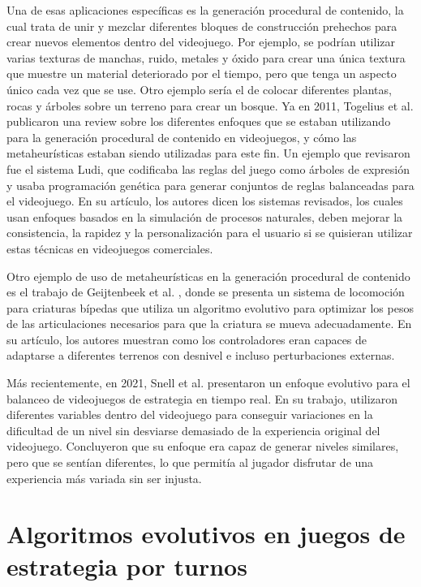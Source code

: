 Una de esas aplicaciones específicas es la generación procedural de contenido, la cual trata de unir y mezclar diferentes bloques de construcción prehechos para crear nuevos elementos dentro del videojuego. Por ejemplo, se podrían utilizar varias texturas de manchas, ruido, metales y óxido para crear una única textura que muestre un material deteriorado por el tiempo, pero que tenga un aspecto único cada vez que se use. Otro ejemplo sería el de colocar diferentes plantas, rocas y árboles sobre un terreno para crear un bosque. Ya en 2011, Togelius et al. \cite{togelius_search-based_2011} publicaron una review sobre los diferentes enfoques que se estaban utilizando para la generación procedural de contenido en videojuegos, y cómo las metaheurísticas estaban siendo utilizadas para este fin. Un ejemplo que revisaron fue el sistema Ludi, que codificaba las reglas del juego como árboles de expresión y usaba programación genética para generar conjuntos de reglas balanceadas para el videojuego. En su artículo, los autores dicen los sistemas revisados, los cuales usan enfoques basados en la simulación de procesos naturales, deben mejorar la consistencia, la rapidez y la personalización para el usuario si se quisieran utilizar estas técnicas en videojuegos comerciales. 

Otro ejemplo de uso de metaheurísticas en la generación procedural de contenido es el trabajo de Geijtenbeek et al. \cite{geijtenbeek_flexible_2013}, donde se presenta un sistema de locomoción para criaturas bípedas que utiliza un algoritmo evolutivo para optimizar los pesos de las articulaciones necesarios para que la criatura se mueva adecuadamente. En su artículo, los autores muestran como los controladores eran capaces de adaptarse a diferentes terrenos con desnivel e incluso perturbaciones externas.

Más recientemente, en 2021, Snell et al. \cite{snell_evolutionary_2021} presentaron un enfoque evolutivo para el balanceo de videojuegos de estrategia en tiempo real. En su trabajo, utilizaron diferentes variables dentro del videojuego para conseguir variaciones en la dificultad de un nivel sin desviarse demasiado de la experiencia original del videojuego. Concluyeron que su enfoque era capaz de generar niveles similares, pero que se sentían diferentes, lo que permitía al jugador disfrutar de una experiencia más variada sin ser injusta.

\section{Algoritmos evolutivos en juegos de estrategia por turnos} \label{sec:trabajos_relacionados}

